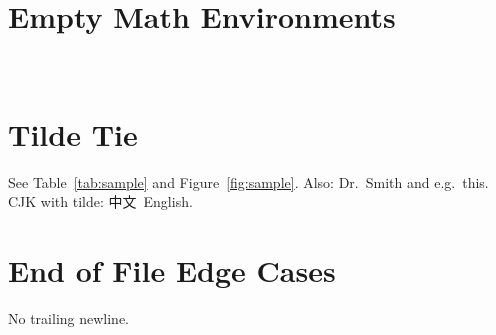 \documentclass{article}
\begin{document}
\section{Empty Math Environments}
\begin{equation}
\end{equation}

\begin{align}
\end{align}

\section{Tilde Tie}
See Table~\ref{tab:sample} and Figure~\ref{fig:sample}.
Also: Dr.~Smith and e.g.~this.
CJK with tilde: 中文~English.

\section{End of File Edge Cases}
No trailing newline. %
\end{document}
